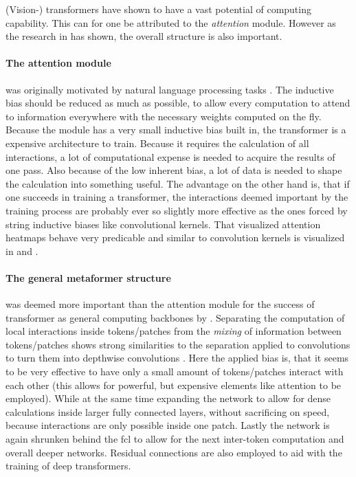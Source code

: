 (Vision-) transformers have shown to have a vast potential of computing capability. 
This can for one be attributed to the \emph{attention} module. 
However as the research in \cite{metaformerPaper} has shown, the overall structure is also important.

\paragraph{The attention module} was originally motivated by natural language processing tasks \cite{attentionIsAllYouNeed}. The inductive bias should be reduced as much as possible, to allow every computation to attend to information everywhere with the necessary weights computed on the fly.
Because the module has a very small inductive bias built in, the transformer is a expensive architecture to train. 
Because it requires the calculation of all interactions, a lot of computational expense is needed to acquire the results of one pass.
Also because of the low inherent bias, a lot of data is needed to shape the calculation into something useful.
The advantage on the other hand is, that if one succeeds in training a transformer, the interactions deemed important by the training process are probably ever so slightly more effective as the ones forced by string inductive biases like convolutional kernels. That visualized attention heatmaps behave very predicable and similar to convolution kernels is visualized in \cite{dinoPaper} and \cite{imageWorth16x16}.

\paragraph{The general metaformer structure} was deemed more important than the attention module for the success of transformer as general computing backbones by \cite{metaformerPaper}.
Separating the computation of local interactions inside tokens/patches from the \emph{mixing} of information between tokens/patches shows strong similarities to the separation applied to convolutions to turn them into depthwise convolutions \cite{mobileNetPaper}.
Here the applied bias is, that it seems to be very effective to have only a small amount of tokens/patches interact with each other (this allows for powerful, but expensive elements like attention to be employed).
While at the same time expanding the network to allow for dense calculations inside larger fully connected layers, without sacrificing on speed, because interactions are only possible inside one patch.
Lastly the network is again shrunken behind the fcl to allow for the next inter-token computation and overall deeper networks.
Residual connections are also employed to aid with the training of deep transformers.

